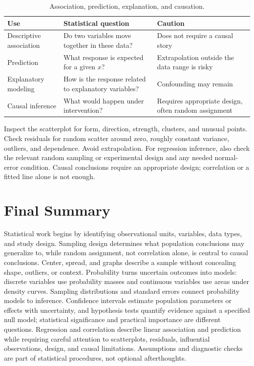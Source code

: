 \documentclass[11pt]{article}
\begin{document}
\begin{table}[ht]
\centering
\caption{Association, prediction, explanation, and causation.}\label{tab:association-causation}
\begin{tabularx}{\textwidth}{@{}lYY@{}}
\toprule
Use & Statistical question & Caution \\
\midrule
Descriptive association & Do two variables move together in these data? & Does not require a causal story \\
Prediction & What response is expected for a given $x$? & Extrapolation outside the data range is risky \\
Explanatory modeling & How is the response related to explanatory variables? & Confounding may remain \\
Causal inference & What would happen under intervention? & Requires appropriate design, often random assignment \\
\bottomrule
\end{tabularx}
\end{table}

\begin{keybox}
Inspect the scatterplot for form, direction, strength, clusters, and unusual
points.  Check residuals for random scatter around zero, roughly constant
variance, outliers, and dependence.  Avoid extrapolation.  For regression
inference, also check the relevant random sampling or experimental design and
any needed normal-error condition.  Causal conclusions require an appropriate
design; correlation or a fitted line alone is not enough.
\end{keybox}

\section*{Final Summary}
Statistical work begins by identifying observational units, variables, data
types, and study design.  Sampling design determines what population
conclusions may generalize to, while random assignment, not correlation
alone, is central to causal conclusions.  Center, spread, and graphs describe
a sample without concealing shape, outliers, or context.  Probability turns
uncertain outcomes into models: discrete variables use probability masses and
continuous variables use areas under density curves.  Sampling distributions
and standard errors connect probability models to inference.  Confidence
intervals estimate population parameters or effects with uncertainty, and
hypothesis tests quantify evidence against a specified null model; statistical
significance and practical importance are different questions.  Regression
and correlation describe linear association and prediction while requiring
careful attention to scatterplots, residuals, influential observations,
design, and causal limitations.  Assumptions and diagnostic checks are part
of statistical procedures, not optional afterthoughts.
\end{document}
